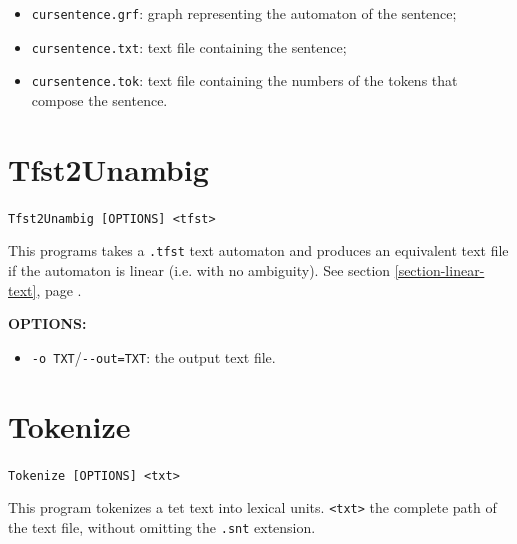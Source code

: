 \begin{itemize}
  \item \verb+cursentence.grf+: graph representing the automaton of the
  sentence;

  \item \verb+cursentence.txt+: text file containing the
  sentence;

  \item \verb+cursentence.tok+: text file containing the
  numbers of the tokens that compose the
  sentence.
\end{itemize}







\section{Tfst2Unambig}
\verb+Tfst2Unambig [OPTIONS] <tfst>+

\bigskip
\noindent This programs takes a \verb$.tfst$ text automaton and produces an
equivalent text file if the automaton is linear (i.e. with no
ambiguity). See section \ref{section-linear-text}, page \pageref{section-linear-text}.

\bigskip
\noindent \textbf{OPTIONS:}
\begin{itemize}
  \item \verb+-o TXT+/\verb+--out=TXT+: the output text file.
\end{itemize}







\section{Tokenize}
\verb+Tokenize [OPTIONS] <txt>+

\bigskip
\noindent This program tokenizes a tet text into lexical units.
\verb+<txt>+ the complete path of the text file, without omitting the \verb+.snt+ 
extension.

